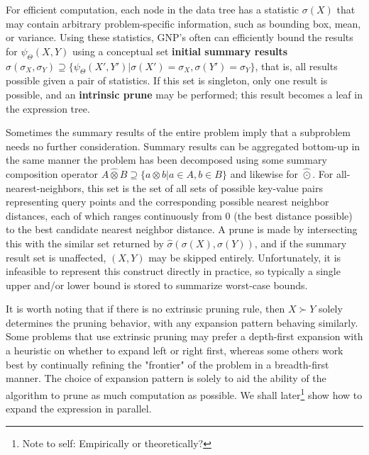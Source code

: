 \documentclass[times, leqno,twocolumn]{article}
\newcommand{\authornote}[1]{\footnote{Note to self: #1}}
\newcommand{\authorsnote}[1]{\authornote{#1}}
\newcommand{\otimeshat}{\widehat{\otimes}}
\newcommand{\odothat}{\widehat{\odot}}
\newcommand{\prefsplit}[2]{#1 \succ #2}
\newcommand{\summary}{\hat{\sigma}}
\newcommand{\gnp}{\psi_{\Theta}}
\newcommand{\defterm}[1]{{\bf #1}}
\newcommand{\kdroot}[1]{#1^{\text{root}}}
\newcommand{\outstat}{\sigma}
\begin{document}
For efficient computation, each node in the data tree has a statistic $\outstat(X)$ that may contain arbitrary problem-specific information, such as bounding box, mean, or variance.
Using these statistics, GNP's often can efficiently bound the results for $\gnp(X,Y)$ using a conceptual set \defterm{initial summary results} $\summary(\outstat_X,\outstat_Y) \supseteq \{\gnp(X',Y') | \outstat(X')\!\!=\!\!\outstat_X, \outstat(Y')\!\!=\!\!\outstat_Y\}$, that is, all results possible given a pair of statistics.
If this set is singleton, only one result is possible, and an \defterm{intrinsic prune} may be performed; this result becomes a leaf in the expression tree.

Sometimes the summary results of the entire problem imply that a subproblem needs no further consideration.
Summary results can be aggregated bottom-up in the same manner the problem has been decomposed using some summary composition operator $A \otimeshat B \supseteq \{a \otimes b | a \in A, b \in B\}$ and likewise for $\odothat$.
For all-nearest-neighbors, this set is the set of all sets of possible key-value pairs representing query points and the corresponding possible nearest neighbor distances, each of which ranges continuously from 0 (the best distance possible) to the best candidate nearest neighbor distance.
A prune is made by intersecting this with the similar set returned by $\summary(\outstat(X),\outstat(Y))$, and if the summary result set is unaffected, $(X,Y)$ may be skipped entirely.
Unfortunately, it is infeasible to represent this construct directly in practice, so typically a single upper and/or lower bound is stored to summarize worst-case bounds.

It is worth noting that if there is no extrinsic pruning rule, then $\prefsplit{X}{Y}$ solely determines the pruning behavior, with any expansion pattern behaving similarly.
Some problems that use extrinsic pruning may prefer a depth-first expansion with a heuristic on whether to expand left or right first, whereas some others work best by continually refining the "frontier" of the problem in a breadth-first manner.
The choice of expansion pattern is solely to aid the ability of the algorithm to prune as much computation as possible.
We shall later\authorsnote{Empirically or theoretically?} show how to expand the expression in parallel.
\end{document}
